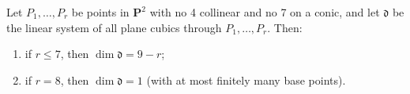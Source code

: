 Let $P_1, \ldots, P_r$ be points in $\mathbf{P}^2$ with no 4 collinear and no 7 on a conic, and let $\mathfrak{d}$ be the linear system of all plane cubics through $P_1, \ldots, P_r$. Then:
\begin{enumerate}
\item[(a)] if $r \leqslant 7$, then $\dim \mathfrak{d} = 9 - r$;
\item[(b)] if $r = 8$, then $\dim \mathfrak{d} = 1$ (with at most finitely many base points).
\end{enumerate}
